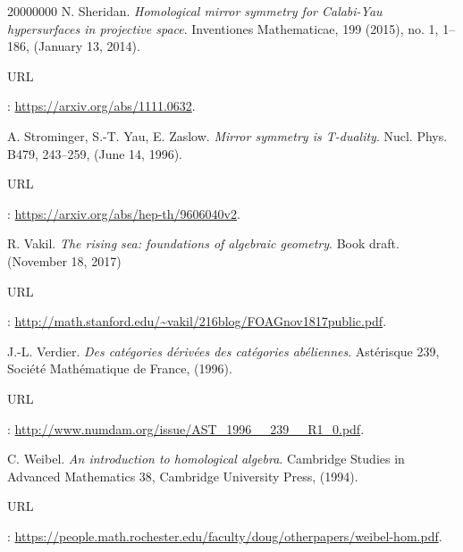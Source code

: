\begin{thebibliography}{20000000}
\bibitem[She14]{[She14]} N. Sheridan. \textit{Homological mirror symmetry for Calabi-Yau hypersurfaces in projective space}. Inventiones Mathematicae, 199 (2015), no. 1, 1--186, (January 13, 2014). \begin{footnotesize}URL\end{footnotesize}: \url{https://arxiv.org/abs/1111.0632}.

\bibitem[SYZ96]{[SYZ96]} A. Strominger, S.-T. Yau, E. Zaslow. \textit{Mirror symmetry is T-duality}. Nucl. Phys. B479, 243--259, (June 14, 1996). \begin{footnotesize}URL\end{footnotesize}: \url{https://arxiv.org/abs/hep-th/9606040v2}.

\bibitem[Vak17]{[Vak17]} R. Vakil. \textit{The rising sea: foundations of algebraic geometry}. Book draft. (November 18, 2017)
\begin{footnotesize}URL\end{footnotesize}: \url{http://math.stanford.edu/~vakil/216blog/FOAGnov1817public.pdf}.

\bibitem[Ver96]{[Ver96]} J.-L. Verdier. \textit{Des catégories dérivées des catégories abéliennes}. Astérisque 239, Société Mathématique de France, (1996). \begin{footnotesize}URL\end{footnotesize}: \url{http://www.numdam.org/issue/AST_1996__239__R1_0.pdf}.

\bibitem[Wei94]{[Wei94]} C. Weibel. \textit{An introduction to homological algebra}. Cambridge Studies in Advanced Mathematics 38, Cambridge University Press, (1994). \begin{footnotesize}URL\end{footnotesize}: \url{https://people.math.rochester.edu/faculty/doug/otherpapers/weibel-hom.pdf}.

\end{thebibliography}

\newpage
\thispagestyle{plain}


\printindex
	
